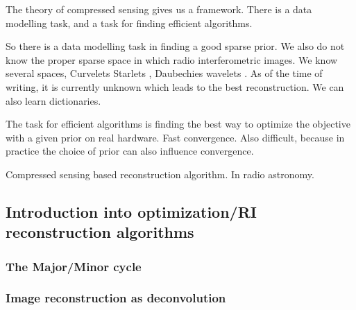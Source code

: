 The theory of compressed sensing gives us a framework. There is a data modelling task, and a task for finding efficient algorithms.

So there is a data modelling task in finding a good sparse prior.
We also do not know the proper sparse space in which radio interferometric images. We know several spaces, Curvelets \cite{starck2003astronomical} Starlets \cite{starck2015starlet}, Daubechies wavelets \cite{carrillo2012sparsity}. As of the time of writing, it is currently unknown which leads to the best reconstruction.
We can also learn dictionaries.

The task for efficient algorithms is finding the best way to optimize the objective with a given prior on real hardware. Fast convergence. Also difficult, because in practice the choice of prior can also influence convergence.


Compressed sensing based reconstruction algorithm. In radio astronomy.








\subsection{Introduction into optimization/RI reconstruction algorithms}\label{intro2:rec}

\subsubsection{The Major/Minor cycle}\label{intro2:opt:cycle}

\subsubsection{Image reconstruction as deconvolution}
